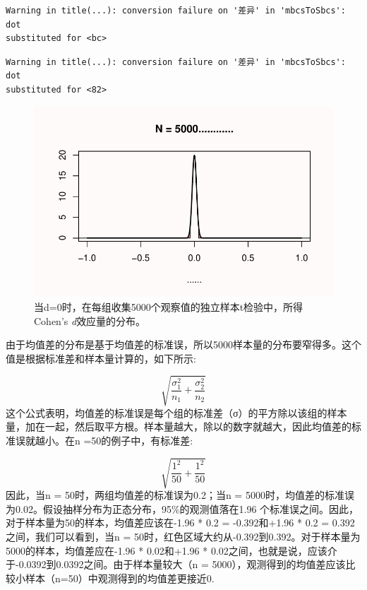 \documentclass[
  letterpaper,
  DIV=11,
  numbers=noendperiod]{scrreprt}
\begin{document}
\begin{verbatim}
Warning in title(...): conversion failure on '差异' in 'mbcsToSbcs': dot
substituted for <bc>
\end{verbatim}

\begin{verbatim}
Warning in title(...): conversion failure on '差异' in 'mbcsToSbcs': dot
substituted for <82>
\end{verbatim}

\begin{figure}

{\centering \includegraphics[width=1\textwidth,height=\textheight]{01-pvalue_files/figure-pdf/fig-fig132-1.pdf}

}

\caption{\label{fig-fig132}当d=0时，在每组收集5000个观察值的独立样本t检验中，所得Cohen's
\emph{d}效应量的分布。}

\end{figure}

由于均值差的分布是基于均值差的标准误，所以5000样本量的分布要窄得多。这个值是根据标准差和样本量计算的，如下所示:

\[\sqrt{\frac{\sigma_{1}^{2}}{n_{1}}+\frac{\sigma_{2}^{2}}{n_{2}}}\]
这个公式表明，均值差的标准误是每个组的标准差（σ）的平方除以该组的样本量，加在一起，然后取平方根。样本量越大，除以的数字就越大，因此均值差的标准误就越小。在n
=50的例子中，有标准差:

\[\sqrt{\frac{1^{2}}{50}+\frac{1^{2}}{50}}\] 因此，当n =
50时，两组均值差的标准误为0.2；当n =
5000时，均值差的标准误为0.02。假设抽样分布为正态分布，95\%的观测值落在1.96
个标准误之间。因此，对于样本量为50的样本，均值差应该在-1.96 * 0.2 =
-0.392和+1.96 * 0.2 = 0.392之间，我们可以看到，当n =
50时，红色区域大约从-0.392到0.392。对于样本量为5000的样本，均值差应在-1.96
* 0.02和+1.96 *
0.02之间，也就是说，应该介于-0.0392到0.0392之间。由于样本量较大（n =
5000），观测得到的均值差应该比较小样本（n=50）中观测得到的均值差更接近0.
\end{document}
